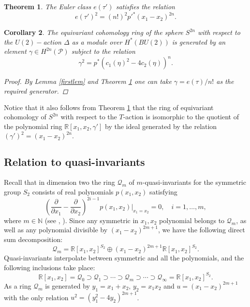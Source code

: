\documentclass[11pt]{amsart}
\newtheorem{theorem}{Theorem}[section]
\newtheorem{cor}[theorem]{Corollary}
\theoremstyle{definition}
\theoremstyle{remark}
\numberwithin{equation}{section}
\begin{document}
\begin{theorem}\label{fourth}
    The Euler class $e(\tau')$ satisfies the relation 
    \[
    e(\tau')^2 = (n!)^2p'^*(x_1-x_2)^{2n}.
    \]
\end{theorem}
\begin{cor}\label{firstcor}
    The equivariant cohomology ring of the sphere $S^{2n}$ with respect to the $U(2)-$action $\Delta$ as a module over $H^*(BU(2))$ is generated by an element $\gamma \in H^{2n}(\mathcal P)$ subject to the relation
    \[
    \gamma^2 = p^*(c_1(\eta)^2-4c_2(\eta))^n.
    \]
    \begin{proof}
     By Lemma \ref{firstlem} and Theorem \ref{fourth} one can take $\gamma=e(\tau)/n!$ as the required generator.
    \end{proof}
\end{cor}
Notice that it also follows from Theorem \ref{fourth} that the ring of equivariant cohomology of $S^{2n}$ with respect to the $T$-action is isomorphic to the quotient of the polynomial ring
$ 
\mathbb R[x_1, x_2, \gamma']
$
by the ideal generated by the relation $
(\gamma')^2=(x_1-x_2)^{2n}$. 


\subsection{Relation to quasi-invariants}
\label{rqisec}

Recall that in dimension two the ring $\mathcal{Q}_m$ of $m$-quasi-invariants for the symmetric group $S_2$ consists of real polynomials $p(x_1,x_2)$ satisfying 
\[
\left(\frac{\partial}{\partial x_1}-\frac{\partial}{\partial x_2} \right)^{2i-1}p(x_1,x_2)|_{x_1=x_2}=0, \quad i=1,\dots,m, 
\]
where $m \in \mathbb N$ (see \cite{CV90}, \cite{FV02}). Since any symmetric in $x_1,x_2$ polynomial belongs to $\mathcal{Q}_m$, as well as any polynomial divisible by $(x_1-x_2)^{2m+1}$, we have the following direct sum decomposition:
\begin{equation}
\label{5}
    \mathcal{Q}_m={\mathbb R}[x_1,x_2]^{S_2}\oplus (x_1-x_2)^{2m+1}{\mathbb R}[x_1,x_2]^{S_2}.
\end{equation}
Quasi-invariants interpolate between symmetric and all the polynomials, and the following inclusions take place:
\[
\mathbb{R}[x_1,x_2] = \mathcal{Q}_0 \supset \mathcal{Q}_1 \supset\cdots \supset \mathcal{Q}_m \supset \cdots \supset \mathcal{Q}_{\infty} = \mathbb{R}[x_1, x_2]^{S_2}.
\]
As a ring $\mathcal{Q}_m$ is generated by $y_1=x_1 + x_2,\, y_2=x_1x_2$ and $u=(x_1-x_2)^{2m+1}$ with the only relation $u^2=(y_1^2-4y_2)^{2m+1}$.
\end{document}
